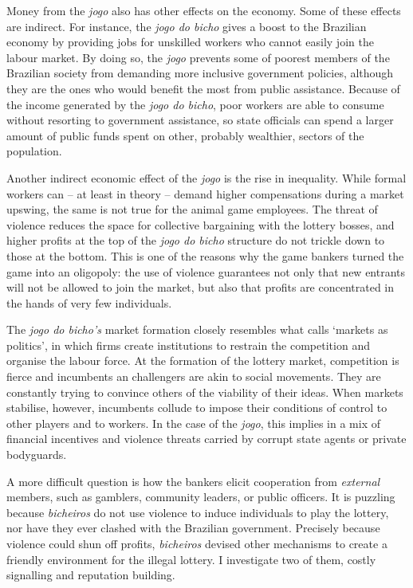\documentclass[a4paper,12pt]{article}
\begin{document}
Money from the \textit{jogo} also has other effects on the economy. Some of these effects are indirect. For instance, the \textit{jogo do bicho} gives a boost to the Brazilian economy by providing jobs for unskilled workers who cannot easily join the labour market. By doing so, the \textit{jogo} prevents some of poorest members of the Brazilian society from demanding more inclusive government policies, although they are the ones who would benefit the most from public assistance. Because of the income generated by the \textit{jogo do bicho}, poor workers are able to consume without resorting to government assistance, so state officials can spend a larger amount of public funds spent on other, probably wealthier, sectors of the population.

Another indirect economic effect of the \textit{jogo} is the rise in inequality. While formal workers can -- at least in theory -- demand higher compensations during a market upswing, the same is not true for the animal game employees. The threat of violence reduces the space for collective bargaining with the lottery bosses, and higher profits at the top of the \textit{jogo do bicho} structure do not trickle down to those at the bottom. This is one of the reasons why the game bankers turned the game into an oligopoly: the use of violence guarantees not only that new entrants will not be allowed to join the market, but also that profits are concentrated in the hands of very few individuals.  

The \textit{jogo do bicho's} market formation closely resembles what \citet{fligstein1996markets} calls `markets as politics', in which firms create institutions to restrain the competition and organise the labour force. At the formation of the lottery market, competition is fierce and incumbents an challengers are akin to social movements. They are constantly trying to convince others of the viability of their ideas. When markets stabilise, however, incumbents collude to impose their conditions of control to other players and to workers. In the case of the \textit{jogo}, this implies in a mix of financial incentives and violence threats carried by corrupt state agents or private bodyguards. 

A more difficult question is how the bankers elicit cooperation from \textit{external} members, such as gamblers, community leaders, or public officers. It is puzzling because \textit{bicheiros} do not use violence to induce individuals to play the lottery, nor have they ever clashed with the Brazilian government. Precisely because violence could shun off profits, \textit{bicheiros} devised other mechanisms to create a friendly environment for the illegal lottery. I investigate two of them, costly signalling and reputation building. 
\end{document}
